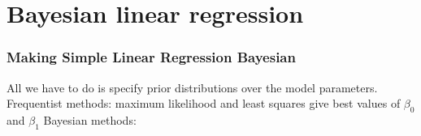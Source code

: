 \documentclass[11pt]{beamer}
\begin{document}
\section{Bayesian linear regression}

\frame
{
\frametitle{Making Simple Linear Regression Bayesian}
	All we have to do is specify prior distributions over the model parameters.
	Frequentist methods: maximum likelihood and least squares give best values of $\beta_0$ and $\beta_1$
	Bayesian methods: 
}

%	
%
%		
%		
%		
%		
%		
%
%
\end{document}
